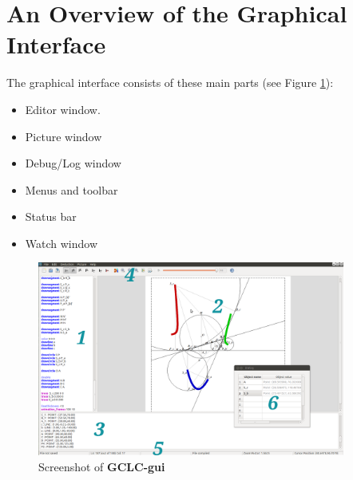 \documentclass[a4paper]{book}
\newcommand{\gclcgui}{{\bfseries GCLC-gui}\xspace}
\begin{document}
\section{An Overview of the Graphical Interface}

The graphical interface consists of these main parts (see Figure \ref{fig:screenshot}):
\begin{itemize}
\item[1] Editor window.
\item[2] Picture window
\item[3] Debug/Log window
\item[4] Menus and toolbar
\item[5] Status bar
\item[6] Watch window
\end{itemize}

\begin{figure}[ht]
\begin{center}
\hspace*{0cm}
\includegraphics[width=0.9\textwidth]{figures/gclc-gui.png}
\end{center}
\caption{Screenshot of \gclcgui}
\label{fig:screenshot}
\end{figure}
\end{document}
